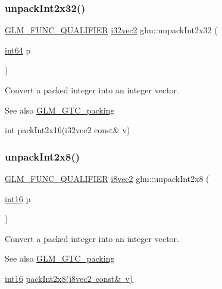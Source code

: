 \subsubsection{\texorpdfstring{unpack\+Int2x32()}{unpackInt2x32()}}
{\footnotesize\ttfamily \mbox{\hyperlink{setup_8hpp_a33fdea6f91c5f834105f7415e2a64407}{G\+L\+M\+\_\+\+F\+U\+N\+C\+\_\+\+Q\+U\+A\+L\+I\+F\+I\+ER}} \mbox{\hyperlink{group__gtc__type__precision_ga99191e0de942ecc1df32d522f8064789}{i32vec2}} glm\+::unpack\+Int2x32 (\begin{DoxyParamCaption}\item[{\mbox{\hyperlink{group__gtc__type__precision_ga435d75819cce297cc5fa21bd84ef89a5}{int64}}}]{p }\end{DoxyParamCaption})}

Convert a packed integer into an integer vector.

\begin{DoxySeeAlso}{See also}
\mbox{\hyperlink{group__gtc__packing}{G\+L\+M\+\_\+\+G\+T\+C\+\_\+packing}} 

int pack\+Int2x16(i32vec2 const\& v) 
\end{DoxySeeAlso}
\mbox{\label{group__gtc__packing_ga55b4670bffab6ddb39d4a0fbf98718c1}} 
\subsubsection{\texorpdfstring{unpack\+Int2x8()}{unpackInt2x8()}}
{\footnotesize\ttfamily \mbox{\hyperlink{setup_8hpp_a33fdea6f91c5f834105f7415e2a64407}{G\+L\+M\+\_\+\+F\+U\+N\+C\+\_\+\+Q\+U\+A\+L\+I\+F\+I\+ER}} \mbox{\hyperlink{group__gtc__type__precision_gade57e4b55fe2b2345a4f2ac2b149cd32}{i8vec2}} glm\+::unpack\+Int2x8 (\begin{DoxyParamCaption}\item[{\mbox{\hyperlink{group__gtc__type__precision_ga2945a61d12771f8954994fcddf02b021}{int16}}}]{p }\end{DoxyParamCaption})}

Convert a packed integer into an integer vector.

\begin{DoxySeeAlso}{See also}
\mbox{\hyperlink{group__gtc__packing}{G\+L\+M\+\_\+\+G\+T\+C\+\_\+packing}} 

\mbox{\hyperlink{group__gtc__type__precision_ga2945a61d12771f8954994fcddf02b021}{int16}} \mbox{\hyperlink{group__gtc__packing_ga532b06d8915c6c65649f828e9106a1d9}{pack\+Int2x8(i8vec2 const\& v)}} 
\end{DoxySeeAlso}
\mbox{\label{group__gtc__packing_ga625619888b95299a1ee0d9e50469c482}} 
